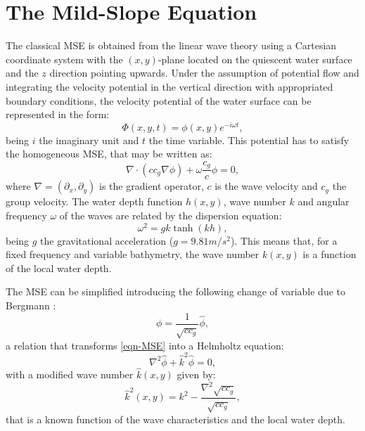\section{The Mild-Slope Equation}
\label{SECTION: Formulation MSE}
The classical MSE \cite{Berkhoff1972,Berkhoff1976} is obtained from the linear wave theory using a Cartesian coordinate system with the $(x,y)$-plane located on the quiescent water surface and the $z$ direction pointing upwards. Under the assumption of potential flow and integrating the velocity potential in the vertical direction with appropriated boundary conditions, the velocity potential of the water surface can be represented in the form:
%
\begin{equation}
\Phi(x,y,t)=\phi(x,y) e^{-i\omega t},
\end{equation}
%
being $i$ the imaginary unit and $t$ the time variable. This potential has to satisfy the homogeneous MSE, that may be written as: 
%
\begin{equation}
\nabla \cdot (cc_{g}\nabla \phi) + \omega \dfrac{c_{g}}{c} \phi = 0,
\label{eqn-MSE}
\end{equation}
%
where $\nabla=(\partial_{x}, \partial_{y})$ is the gradient operator, $c$ is the wave velocity and $c_{g}$ the group velocity. The water depth function $h(x,y)$, wave number $k$ and angular frequency $\omega$ of the waves are related by the dispersion equation:
%
\begin{equation}
\label{eqn:dispersionEquation}
\omega^{2}=gk \tanh(kh),
\end{equation}
%
being $g$ the gravitational acceleration ($g=9.81m/s^{2}$). This means that, for a fixed frequency and variable bathymetry, the wave number $k(x,y)$ is a function of the local water depth.

The MSE can be simplified introducing the following change of variable due to Bergmann \cite{Bergmann1946}:
%
\begin{equation}
\label{eqn:ChangeVariable}
\phi=\dfrac{1}{\sqrt{cc_{g}}}\hat{\phi},
\end{equation}
%
a relation that transforms \eqref{eqn-MSE} into a Helmholtz equation: 
%
\begin{equation}
\label{eqn:Helmholtz}
\nabla^{2} \hat{\phi} + \hat{k}^{2}  \hat{\phi} = 0, 
\end{equation}
%
with a modified wave number $\hat{k}(x,y)$ given by:
\begin{equation}
\label{eqn:k con gorro}
\hat{k}^{2}(x,y)= k^{2} - \frac{\nabla^{2}\sqrt{cc_{g}}}{\sqrt{cc_{g}}},
\end{equation}
%
that is a known function of the wave characteristics and the local water depth.

